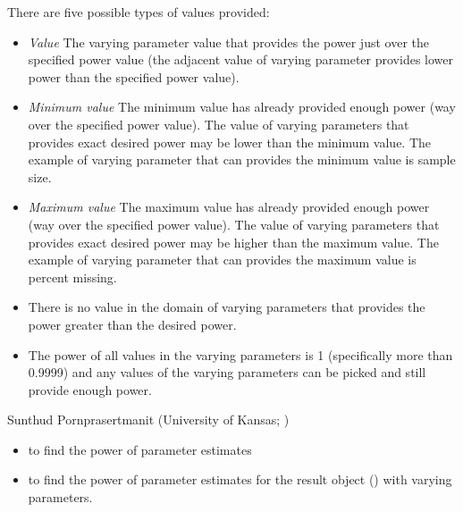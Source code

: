 \documentclass[a4paper]{book}
\begin{document}
\begin{Value}
There are five possible types of values provided:
\begin{itemize}

\item \emph{Value} The varying parameter value that provides the power just over the specified power value (the adjacent value of varying parameter provides lower power than the specified power value).
\item \emph{Minimum value} The minimum value has already provided enough power (way over the specified power value). The value of varying parameters that provides exact desired power may be lower than the minimum value. The example of varying parameter that can provides the minimum value is sample size.
\item \emph{Maximum value} The maximum value has already provided enough power (way over the specified power value). The value of varying parameters that provides exact desired power may be higher than the maximum value. The example of varying parameter that can provides the maximum value is percent missing.
\item {} There is no value in the domain of varying parameters that provides the power greater than the desired power.
\item {} The power of all values in the varying parameters is 1 (specifically more than 0.9999) and any values of the varying parameters can be picked and still provide enough power.

\end{itemize}

\end{Value}
%
\begin{Author}\relax
Sunthud Pornprasertmanit (University of Kansas; )
\end{Author}
%
\begin{SeeAlso}\relax
\begin{itemize}

\item {} to find the power of parameter estimates		
\item {} to find the power of parameter estimates for the result object () with varying parameters.

\end{itemize}

\end{SeeAlso}
\end{document}
